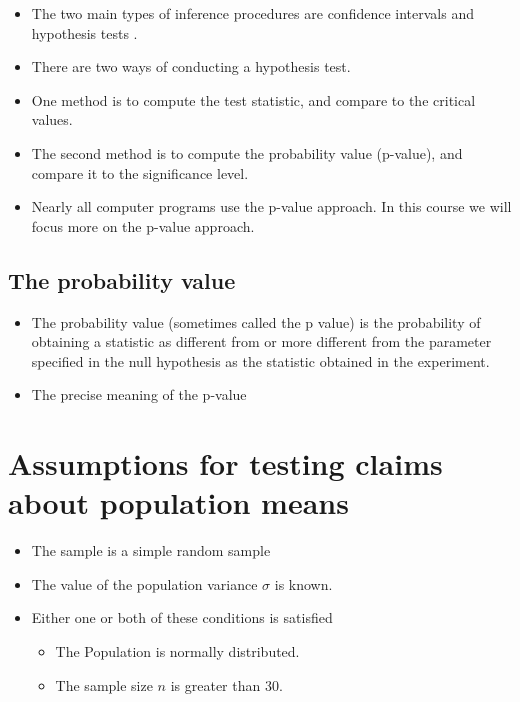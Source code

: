 \documentclass[]{report}
\begin{document}
\begin{itemize}
\item The two main types of inference procedures are confidence intervals and hypothesis tests .\item There are two ways of conducting a hypothesis test.\item  One method is to compute the test statistic, and compare to the critical values.\item The second method is to compute the probability value (p-value), and compare it to the significance level.\item Nearly all computer programs use the p-value approach. In this course we will focus more on the p-value approach.
\end{itemize}

\subsection{The probability value }
\begin{itemize}
\item The probability value (sometimes called the p value) is the probability of obtaining a statistic as different from or more different from the parameter specified in the null hypothesis as the statistic obtained in the experiment. 
\item The precise meaning of the p-value
\end{itemize}


\section{Assumptions for testing claims about population means}
{
\begin{itemize}
\item The sample is a simple random sample
\item The value of the population variance $\sigma$ is known.
\item Either one or both of these conditions is satisfied
\begin{itemize}
\item The Population is normally distributed.
\item The sample size $n$ is greater than 30.
\end{itemize}
\end{itemize}
}
\end{document}
